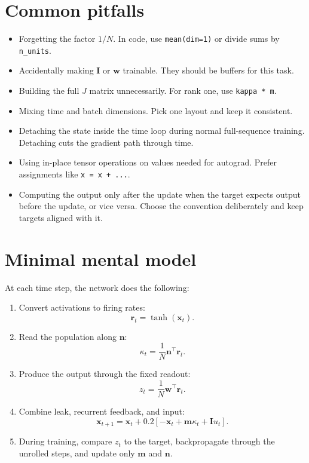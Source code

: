 \documentclass[11pt]{article}
\newcommand{\vx}{\mathbf{x}}
\newcommand{\vm}{\mathbf{m}}
\newcommand{\vn}{\mathbf{n}}
\newcommand{\vI}{\mathbf{I}}
\newcommand{\vw}{\mathbf{w}}
\newcommand{\vr}{\mathbf{r}}
\begin{document}
\section{Common pitfalls}

\begin{itemize}
  \item Forgetting the factor $1/N$. In code, use \texttt{mean(dim=1)} or divide
  sums by \texttt{n\_units}.
  \item Accidentally making $\vI$ or $\vw$ trainable. They should be buffers for
  this task.
  \item Building the full $J$ matrix unnecessarily. For rank one, use
  \texttt{kappa * m}.
  \item Mixing time and batch dimensions. Pick one layout and keep it consistent.
  \item Detaching the state inside the time loop during normal full-sequence
  training. Detaching cuts the gradient path through time.
  \item Using in-place tensor operations on values needed for autograd. Prefer
  assignments like \texttt{x = x + ...}.
  \item Computing the output only after the update when the target expects output
  before the update, or vice versa. Choose the convention deliberately and keep
  targets aligned with it.
\end{itemize}

\section{Minimal mental model}

At each time step, the network does the following:
\begin{enumerate}
  \item Convert activations to firing rates:
  \[
    \vr_t = \tanh(\vx_t).
  \]
  \item Read the population along $\vn$:
  \[
    \kappa_t = \frac{1}{N}\vn^\top\vr_t.
  \]
  \item Produce the output through the fixed readout:
  \[
    z_t = \frac{1}{N}\vw^\top\vr_t.
  \]
  \item Combine leak, recurrent feedback, and input:
  \[
    \vx_{t+1}
    =
    \vx_t
    +
    0.2
    \left[
      -\vx_t + \vm\kappa_t + \vI u_t
    \right].
  \]
  \item During training, compare $z_t$ to the target, backpropagate through the
  unrolled steps, and update only $\vm$ and $\vn$.
\end{enumerate}
\end{document}
